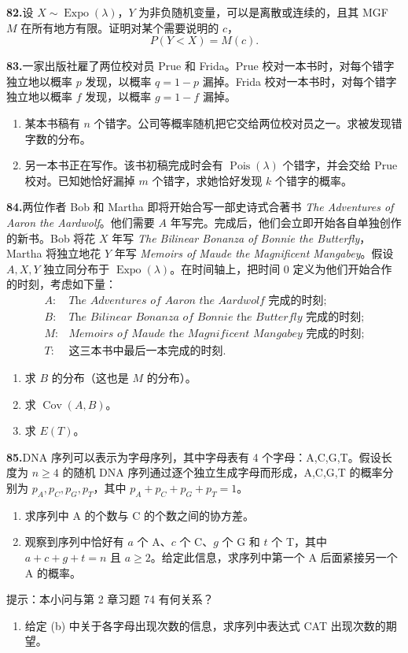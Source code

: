 \documentclass[UTF8,12pt,a4paper,fontset=fandol]{ctexart}
\begin{document}
\noindent\textbf{82.}\quad 设 $X\sim \operatorname{Expo}(\lambda)$，$Y$ 为非负随机变量，可以是离散或连续的，且其 MGF $M$ 在所有地方有限。证明对某个需要说明的 $c$，
\[
  P(Y<X)=M(c).
\]

\noindent\textbf{83.}\quad 一家出版社雇了两位校对员 Prue 和 Frida。Prue 校对一本书时，对每个错字独立地以概率 $p$ 发现，以概率 $q=1-p$ 漏掉。Frida 校对一本书时，对每个错字独立地以概率 $f$ 发现，以概率 $g=1-f$ 漏掉。
\begin{enumerate}
  \item[(a)] 某本书稿有 $n$ 个错字。公司等概率随机把它交给两位校对员之一。求被发现错字数的分布。
  \item[(b)] 另一本书正在写作。该书初稿完成时会有 $\operatorname{Pois}(\lambda)$ 个错字，并会交给 Prue 校对。已知她恰好漏掉 $m$ 个错字，求她恰好发现 $k$ 个错字的概率。
\end{enumerate}

\noindent\textbf{84.}\quad 两位作者 Bob 和 Martha 即将开始合写一部史诗式合著书 \textit{The Adventures of Aaron the Aardwolf}。他们需要 $A$ 年写完。完成后，他们会立即开始各自单独创作的新书。Bob 将花 $X$ 年写 \textit{The Bilinear Bonanza of Bonnie the Butterfly}，Martha 将独立地花 $Y$ 年写 \textit{Memoirs of Maude the Magnificent Mangabey}。假设 $A,X,Y$ 独立同分布于 $\operatorname{Expo}(\lambda)$。在时间轴上，把时间 $0$ 定义为他们开始合作的时刻，考虑如下量：
\[
\begin{array}{ll}
  A: & \textit{The Adventures of Aaron the Aardwolf} \text{ 完成的时刻};\\
  B: & \textit{The Bilinear Bonanza of Bonnie the Butterfly} \text{ 完成的时刻};\\
  M: & \textit{Memoirs of Maude the Magnificent Mangabey} \text{ 完成的时刻};\\
  T: & \text{这三本书中最后一本完成的时刻}.
\end{array}
\]
\begin{enumerate}
  \item[(a)] 求 $B$ 的分布（这也是 $M$ 的分布）。
  \item[(b)] 求 $\operatorname{Cov}(A,B)$。
  \item[(c)] 求 $E(T)$。
\end{enumerate}

\noindent\textbf{85.}\quad DNA 序列可以表示为字母序列，其中字母表有 4 个字母：A,C,G,T。假设长度为 $n\ge 4$ 的随机 DNA 序列通过逐个独立生成字母而形成，A,C,G,T 的概率分别为 $p_A,p_C,p_G,p_T$，其中 $p_A+p_C+p_G+p_T=1$。
\begin{enumerate}
  \item[(a)] 求序列中 A 的个数与 C 的个数之间的协方差。
  \item[(b)] 观察到序列中恰好有 $a$ 个 A、$c$ 个 C、$g$ 个 G 和 $t$ 个 T，其中 $a+c+g+t=n$ 且 $a\ge 2$。给定此信息，求序列中第一个 A 后面紧接另一个 A 的概率。
\end{enumerate}
提示：本小问与第 2 章习题 74 有何关系？
\begin{enumerate}
  \item[(c)] 给定 (b) 中关于各字母出现次数的信息，求序列中表达式 CAT 出现次数的期望。
\end{enumerate}
\end{document}

